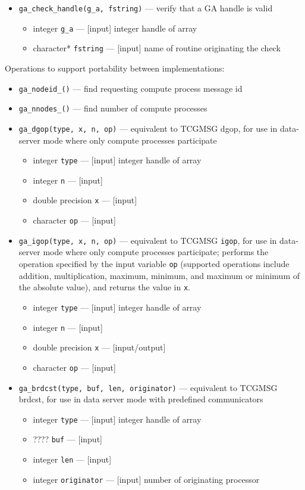 \begin{itemize}
\item {\tt ga\_check\_handle(g\_a, fstring)} --- verify that a GA handle is valid
\begin{itemize}
\item     integer {\tt g\_a}         --- [input] integer handle of array
\item     character* {\tt fstring}  --- [input] name of routine originating the check
\end{itemize}

\end{itemize}

Operations to support portability between implementations:
\begin{itemize}
\item {\tt ga\_nodeid\_()} --- find requesting compute process message id
\item {\tt ga\_nnodes\_()} --- find number of compute processes
\item {\tt ga\_dgop(type, x, n, op)} --- equivalent to TCGMSG dgop, for use in data-server
mode where only compute processes participate
\begin{itemize}
\item     integer {\tt type}        --- [input] integer handle of array
\item     integer {\tt n}           --- [input]
\item     double precision {\tt x}  --- [input] 
\item     character {\tt op}        --- [input] 
\end{itemize}

\item {\tt ga\_igop(type, x, n, op)} --- equivalent to TCGMSG {\tt igop}, for use in data-server mode
where only compute processes participate; performs the operation specified by the input variable
{\tt op} (supported operations include addition, multiplication, maximum, minimum, 
and maximum or minimum of the absolute
value), and returns the value in {\tt x}.
\begin{itemize}
\item     integer {\tt type}        --- [input] integer handle of array
\item     integer {\tt n}           --- [input]
\item     double precision {\tt x}  --- [input/output]
\item     character {\tt op}        --- [input] 
\end{itemize}

\item {\tt ga\_brdcst(type, buf, len, originator)} --- equivalent to TCGMSG brdcst, for use in data server mode
with predefined communicators
\begin{itemize}
\item     integer {\tt type}        --- [input] integer handle of array
\item     ????    {\tt buf}         --- [input]
\item     integer {\tt len}         --- [input]
\item     integer {\tt originator}  --- [input] number of originating processor
\end{itemize}


\end{itemize}
